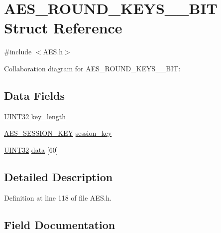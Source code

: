 \hypertarget{struct_a_e_s___r_o_u_n_d___k_e_y_s__256___b_i_t}{}\section{A\+E\+S\+\_\+\+R\+O\+U\+N\+D\+\_\+\+K\+E\+Y\+S\+\_\+\_\+\+B\+I\+T Struct Reference}
\label{struct_a_e_s___r_o_u_n_d___k_e_y_s__256___b_i_t}


{\ttfamily \#include $<$A\+E\+S.\+h$>$}



Collaboration diagram for A\+E\+S\+\_\+\+R\+O\+U\+N\+D\+\_\+\+K\+E\+Y\+S\+\_\+\_\+\+B\+I\+T\+:
\subsection*{Data Fields}
\begin{DoxyCompactItemize}
\item 
\hyperlink{_generic_type_defs_8h_a1720f33f59b583f0c2ed071815623a86}{U\+I\+N\+T32} \hyperlink{struct_a_e_s___r_o_u_n_d___k_e_y_s__256___b_i_t_aa42d871fcd1183159392e19781181b56}{key\+\_\+length}
\item 
\hyperlink{_a_e_s___e_c_b___p_i_c32_8h_a0e0971acf88a8f0e37953380fcbb10b3}{A\+E\+S\+\_\+\+S\+E\+S\+S\+I\+O\+N\+\_\+\+K\+E\+Y} \hyperlink{struct_a_e_s___r_o_u_n_d___k_e_y_s__256___b_i_t_a8188e88d5ecaef25564a4afaaf888573}{session\+\_\+key}
\item 
\hyperlink{_generic_type_defs_8h_a1720f33f59b583f0c2ed071815623a86}{U\+I\+N\+T32} \hyperlink{struct_a_e_s___r_o_u_n_d___k_e_y_s__256___b_i_t_ae08c670d6f02eae00b54f6fe83a58419}{data} \mbox{[}60\mbox{]}
\end{DoxyCompactItemize}


\subsection{Detailed Description}


Definition at line 118 of file A\+E\+S.\+h.



\subsection{Field Documentation}
\hypertarget{struct_a_e_s___r_o_u_n_d___k_e_y_s__256___b_i_t_ae08c670d6f02eae00b54f6fe83a58419}{}
